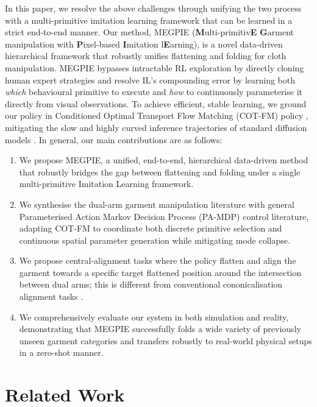 \documentclass[journal]{IEEEtran}
\begin{document}
In this paper, we resolve the above challenges through unifying the two process with a multi-primitive imitation learning framework that can be learned in a strict end-to-end manner. Our method, MEGPIE (\textbf{M}ulti-primitiv\textbf{E} \textbf{G}arment manipulation with \textbf{P}ixel-based \textbf{I}mitation l\textbf{E}arning), is a novel data-driven hierarchical framework that robustly unifies flattening and folding for cloth manipulation. MEGPIE bypasses intractable RL exploration by directly cloning human expert strategies and resolve IL's compounding error by learning both \textit{which} behavioural primitive to execute and \textit{how} to continuously parameterise it directly from visual observations. To achieve efficient, stable learning, we ground our policy in Conditioned Optimal Transport Flow Matching (COT-FM) policy \cite{lipman2022flow, black2024pi0, chang2026efficientflow}, mitigating the slow and highly curved inference trajectories of standard diffusion models \cite{chi2025diffusion}. In general, our main contributions are as follows:
\begin{enumerate}
    \item We propose MEGPIE, a unified, end-to-end,  hierarchical data-driven method that robustly bridges the gap between flattening and folding under a single multi-primitive Imitation Learning framework.
    
    \item We synthesise the dual-arm garment manipulation literature with general Parameterised Action Markov Decision Process (PA-MDP) control literature, adapting COT-FM to coordinate both discrete primitive selection and continuous spatial parameter generation while mitigating mode collapse.

    \item We propose central-alignment tasks where the policy flatten and align the garment towards a specific target flattened position around the intersection between dual arms; this is different from conventional cononicalisation alignment tasks \cite{avigal2022speedfolding, xue2023unifolding, canberk2022cloth}.
   
    \item We comprehensively evaluate our system in both simulation and reality, demonstrating that MEGPIE successfully folds a wide variety of previously unseen garment categories and transfers robustly to real-world physical setups in a zero-shot manner.
\end{enumerate}


\section{Related Work}
\end{document}
